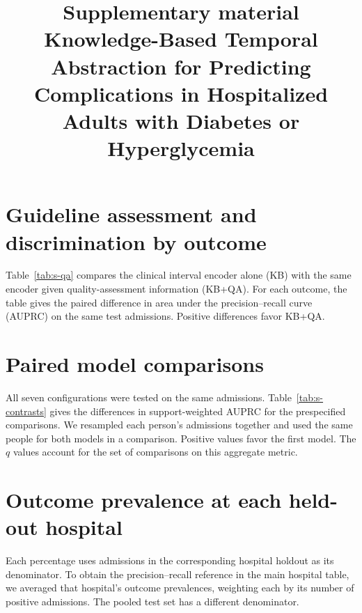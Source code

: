 ﻿\documentclass[11pt,a4paper]{article}
\title{Supplementary material\\[.4em]\large Knowledge-Based Temporal Abstraction for Predicting Complications in Hospitalized Adults with Diabetes or Hyperglycemia}
\author{}
\date{}
\begin{document}
\maketitle
\section{Guideline assessment and discrimination by outcome}
Table~\ref{tab:s-qa} compares the clinical interval encoder alone (KB) with the same encoder given quality-assessment information (KB+QA). For each outcome, the table gives the paired difference in area under the precision--recall curve (AUPRC) on the same test admissions. Positive differences favor KB+QA.
\begin{table}[htbp]\centering\small
\caption{Difference in AUPRC between KB+QA and KB for each outcome. Each 95\% bootstrap interval, clustered by person, applies to one comparison. The $q$ values account for the eight comparisons using the Benjamini--Hochberg procedure to control the false discovery rate.}
\label{tab:s-qa}\end{table}

\section{Paired model comparisons}
All seven configurations were tested on the same admissions. Table~\ref{tab:s-contrasts} gives the differences in support-weighted AUPRC for the prespecified comparisons. We resampled each person's admissions together and used the same people for both models in a comparison. Positive values favor the first model. The $q$ values account for the set of comparisons on this aggregate metric.
\begin{table}[htbp]\centering\small\caption{Paired differences in weighted AUPRC with 95\% bootstrap intervals clustered by person. For QA, the difference is the estimate with guideline assessment minus the estimate without it.}\label{tab:s-contrasts}\end{table}
\clearpage
\section{Outcome prevalence at each held-out hospital}
Each percentage uses admissions in the corresponding hospital holdout as its denominator. To obtain the precision--recall reference in the main hospital table, we averaged that hospital's outcome prevalences, weighting each by its number of positive admissions. The pooled test set has a different denominator.
\begin{table}[htbp]\centering\scriptsize\caption{Outcome prevalence by held-out hospital (percent). Full hospital names are given in the main holdout table.}\resizebox{\linewidth}{!}{}\end{table}
\clearpage
\end{document}
